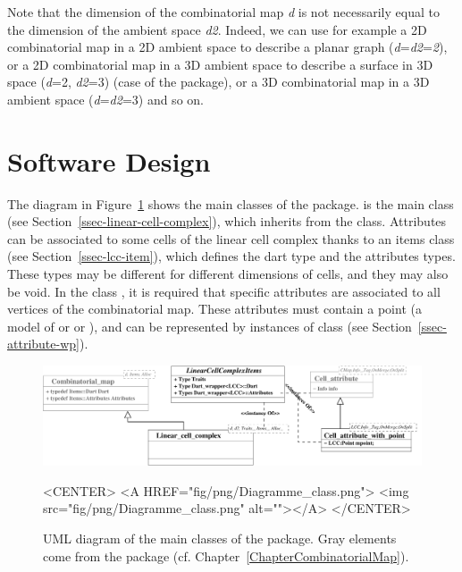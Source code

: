 Note that the dimension of the combinatorial map \emph{d} is not
necessarily equal to the dimension of the ambient space
\emph{d2}. Indeed, we can use for example a 2D combinatorial map in a
2D ambient space to describe a planar graph
(\emph{d}=\emph{d2}=\emph{2}), or a 2D combinatorial map in a 3D
ambient space to describe a surface in 3D space (\emph{d}=2,
\emph{d2}=3) (case of the  package), or a 3D
combinatorial map in a 3D ambient space (\emph{d}=\emph{d2}=3) and so
on.

\section{Software Design}

The diagram in Figure~\ref{fig-diagram_class_lcc} shows the main
classes of the package.   is the main
class (see Section~\ref{ssec-linear-cell-complex}), which inherits from
the  class.  Attributes can be associated
to some cells of the linear cell complex thanks to an items class (see
Section~\ref{ssec-lcc-item}), which defines the dart type and the
attributes types. These types may be different for different
dimensions of cells, and they may also be void.  In the class
, it is required that
specific attributes are associated to all vertices of the
combinatorial map. These attributes must contain a point (a model of
 or  or ),
and can be represented by instances of class
 (see
Section~\ref{ssec-attribute-wp}).
%
\begin{figure}
  \begin{ccTexOnly}
    \begin{center}
      \includegraphics[width=.95\textwidth]
      {Linear_cell_complex/fig/pdf/Diagramme_class}
    \end{center}
  \end{ccTexOnly}
  \begin{ccHtmlOnly}
    <CENTER>
    <A HREF="fig/png/Diagramme_class.png">
        <img src="fig/png/Diagramme_class.png" alt=""></A>
    </CENTER>
    \end{ccHtmlOnly}
    \caption{UML diagram of the main classes of the package. Gray
      elements come from the  package 
      (cf. Chapter~\ref{ChapterCombinatorialMap}).}
    \label{fig-diagram_class_lcc}
\end{figure}


